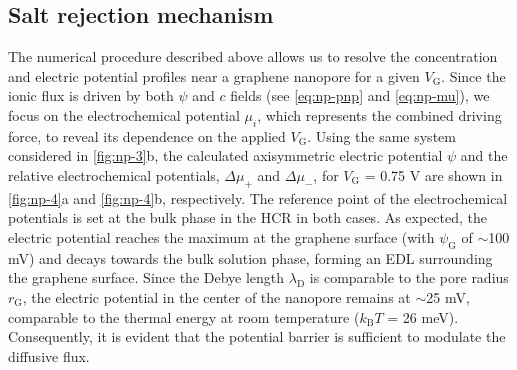 \subsection{Salt rejection mechanism}
\label{sec:np-mechanism}

The numerical procedure described above allows us to resolve the
concentration and electric potential profiles near a graphene
nanopore for a given $V_{\mathrm{G}}$.
%
Since the ionic flux is driven
by both $\psi$ and $c$ fields (see  \autoref{eq:np-pnp} and \autoref{eq:np-mu}),
we focus on the electrochemical potential $\mu_{i}$, which represents
the combined driving force, to reveal its dependence on the applied
$V_{\mathrm{G}}$.
%
Using the same system considered in 
\autoref{fig:np-3}b, the calculated axisymmetric electric potential $\psi$
and the relative electrochemical potentials,
$\Delta \mu_{+}$ and $\Delta \mu_{-}$, for
$V_{\mathrm{G}}$ = 0.75 V are shown in  \autoref{fig:np-4}a and
\autoref{fig:np-4}b, respectively. 
%
The reference point of the electrochemical
potentials is set at the bulk phase in the HCR in both cases.
%
As expected, the electric potential reaches the maximum at the
graphene surface (with $\psi_{\mathrm{G}}$ of $\sim$100 mV) and decays
towards the bulk solution phase, forming an EDL surrounding the
graphene surface. Since the Debye length $\lambda_{\mathrm{D}}$ is
comparable to the pore radius $r_{\mathrm{G}}$, the electric potential
in the center of the nanopore remains at $\sim$25 mV, comparable to
the thermal energy at room temperature ($k_{\mathrm{B}}T$ = 26
meV). Consequently, it is evident that the potential barrier is
sufficient to modulate the diffusive flux.

